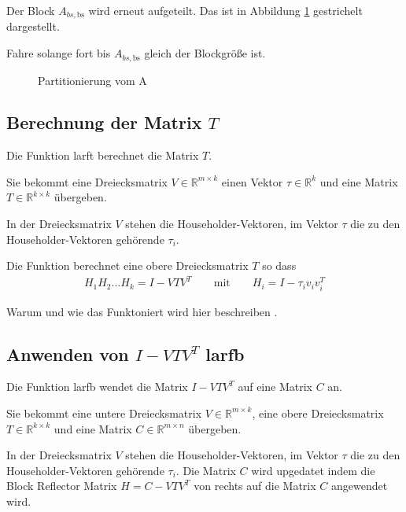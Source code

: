 
Der Block $A_{bs, \text{bs}}$ wird erneut aufgeteilt. Das ist in Abbildung \ref{fig:blockA} gestrichelt dargestellt.

Fahre solange fort bis $A_{bs, \text{bs}}$ gleich der Blockgröße ist.
\begin{figure}[H]
	\centering
	
	\caption{Partitionierung vom A}
	\label{fig:blockA}
\end{figure}

\subsection{Berechnung der Matrix $T$}
Die Funktion \glqq larft\grqq{} berechnet die Matrix $T$. 

Sie bekommt eine Dreiecksmatrix $V \in \mathbb{R}^{m \times k}$ einen Vektor $\tau \in \mathbb{R}^k$ und eine Matrix $T\in \mathbb{R}^{k\times k}$ übergeben. 

In der Dreiecksmatrix $V$ stehen die Householder-Vektoren,
im Vektor $\tau$ die zu den Householder-Vektoren gehörende $\tau_i$.

Die Funktion berechnet eine obere Dreiecksmatrix $T$ so dass
\begin{align*}
	H_1H_2...H_k = I - VTV^T \qquad \text{mit}\qquad H_i = I - \tau_i v_iv_i^T
\end{align*}

Warum und wie das Funktoniert wird hier beschreiben \cite{Joffrain:2006:AHT:1141885.1141886}.




\subsection{Anwenden von $I - VTV^T$ larfb}

Die Funktion \glqq larfb \grqq{} wendet die Matrix $I - VTV^T$ auf eine Matrix $C$ an.

Sie bekommt eine untere Dreiecksmatrix $V \in \mathbb{R}^{m \times k}$, eine obere Dreiecksmatrix $T \in \mathbb{R}^{k \times k}$ und eine Matrix $C \in \mathbb{R}^{m \times n }$ übergeben.

In der Dreiecksmatrix $V$ stehen die Householder-Vektoren,
im Vektor $\tau$ die zu den Householder-Vektoren gehörende $\tau_i$.
Die Matrix $C$ wird upgedatet indem die  Block Reflector Matrix $ 	H = C - V T V^T $ von rechts auf die Matrix $ C $ angewendet wird. 

